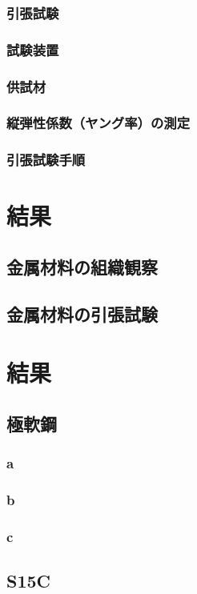 \documentclass[10pt,a4j]{jsarticle}
\begin{document}
  \subsubsection{引張試験}
  \subsubsection{試験装置}
  \subsubsection{供試材}
  \subsubsection{縦弾性係数（ヤング率）の測定}
  \subsubsection{引張試験手順}
\section{結果}
  \subsection{金属材料の組織観察}
  \subsection{金属材料の引張試験}
\section{結果}
  \subsection{極軟鋼}
    \subsubsection{a}
    \subsubsection{b}
    \subsubsection{c}
  \subsection{S15C}
\end{document}
